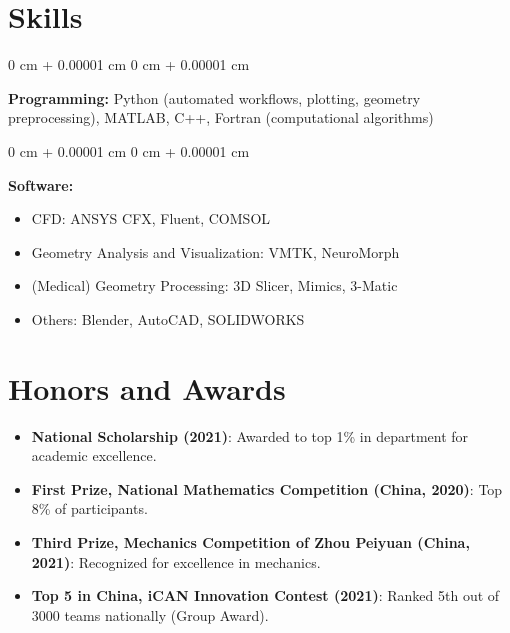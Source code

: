 \documentclass[10pt, letterpaper]{article}
\newenvironment{highlights}{
    \begin{itemize}[
        topsep=0.10 cm,
        parsep=0.10 cm,
        partopsep=0pt,
        itemsep=0pt,
        leftmargin=0 cm + 10pt
    ]
}{
    \end{itemize}
} %
\newenvironment{onecolentry}{
    \begin{adjustwidth}{
        0 cm + 0.00001 cm
    }{
        0 cm + 0.00001 cm
    }
}{
    \end{adjustwidth}
} %
\begin{document}
        \vspace{0.2 cm}

    \section{Skills}

    \begin{onecolentry}
        \textbf{Programming:} Python (automated workflows, plotting, geometry preprocessing), MATLAB, C++, Fortran (computational algorithms)
    \end{onecolentry}

    \vspace{0.2 cm}

    \begin{onecolentry}
        \textbf{Software:} 
        \begin{itemize}
            \item CFD:  ANSYS CFX, Fluent, COMSOL
            \item Geometry Analysis and Visualization: VMTK, NeuroMorph
            \item (Medical) Geometry Processing: 3D Slicer, Mimics, 3-Matic
            \item Others: Blender, AutoCAD, SOLIDWORKS
        \end{itemize}
    \end{onecolentry}




    \section{Honors and Awards}

    \begin{highlights}
        \item \textbf{National Scholarship (2021)}: Awarded to top 1\% in department for academic excellence.
        \item \textbf{First Prize, National Mathematics Competition (China, 2020)}: Top 8\% of participants.
        \item \textbf{Third Prize, Mechanics Competition of Zhou Peiyuan (China, 2021)}: Recognized for excellence in mechanics.
        \item \textbf{Top 5 in China, iCAN Innovation Contest (2021)}: Ranked 5th out of 3000 teams nationally (Group Award).
    \end{highlights}
\end{document}
